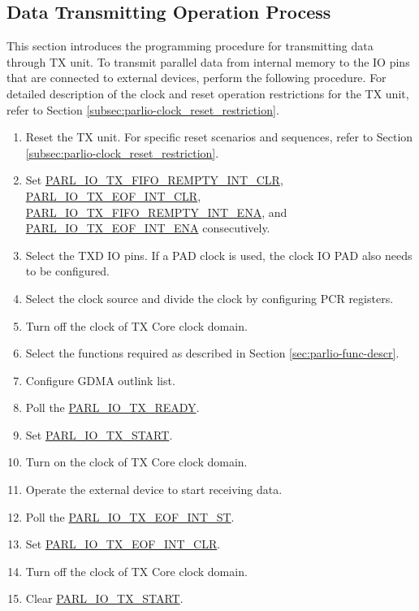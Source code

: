 \documentclass[main\_\_EN.tex]{subfiles}
\begin{document}
\subsection{Data Transmitting Operation Process}
This section introduces the programming procedure for transmitting data through TX unit. To transmit parallel data from internal memory to the IO pins that are connected to external devices, perform the following procedure. For detailed description of the clock and reset operation restrictions for the TX unit, refer to Section \ref{subsec:parlio-clock_reset_restriction}.
\begin{enumerate}
    \item Reset the TX unit. For specific reset scenarios and sequences, refer to Section \ref{subsec:parlio-clock_reset_restriction}.
    \item Set \hyperref[fielddesc:PARLIOTXFIFOREMPTYINTCLR]{PARL\_IO\_TX\_FIFO\_REMPTY\_INT\_CLR}, \hyperref[fielddesc:PARLIOTXEOFINTCLR]{PARL\_IO\_TX\_EOF\_INT\_CLR}, \hyperref[fielddesc:PARLIOTXFIFOREMPTYINTENA]{PARL\_IO\_TX\_FIFO\_REMPTY\_INT\_ENA}, and \hyperref[fielddesc:PARLIOTXEOFINTENA]{PARL\_IO\_TX\_EOF\_INT\_ENA} consecutively. 
    \item Select the TXD IO pins. If a PAD clock is used, the clock IO PAD also needs to be configured. 
    \item Select the clock source and  divide the clock by configuring PCR registers.
    \item Turn off the clock of TX Core clock domain.
    \item Select the functions required as described in Section \ref{sec:parlio-func-descr}.
    \item Configure GDMA outlink list.
    \item Poll the \hyperref[fielddesc:PARLIOTXREADY]{PARL\_IO\_TX\_READY}.
    \item Set \hyperref[fielddesc:PARLIOTXSTART]{PARL\_IO\_TX\_START}.
    \item Turn on the clock of TX Core clock domain.
    \item Operate the external device to start receiving data.
    \item Poll the \hyperref[fielddesc:PARLIOTXEOFINTST]{PARL\_IO\_TX\_EOF\_INT\_ST}.
    \item Set \hyperref[fielddesc:PARLIOTXEOFINTCLR]{PARL\_IO\_TX\_EOF\_INT\_CLR}.
    \item Turn off the clock of TX Core clock domain.
    \item Clear \hyperref[fielddesc:PARLIOTXSTART]{PARL\_IO\_TX\_START}.
\end{enumerate}
\end{document}
